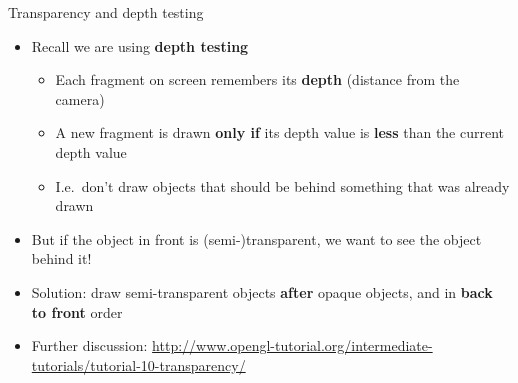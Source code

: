 \begin{frame}{Transparency and depth testing}
	\begin{itemize}
		\pause\item Recall we are using \textbf{depth testing}
			\begin{itemize}
				\pause\item Each fragment on screen remembers its \textbf{depth} (distance from the camera)
				\pause\item A new fragment is drawn \textbf{only if} its depth value is \textbf{less} than the current depth value
				\pause\item I.e.\ don't draw objects that should be behind something that was already drawn
			\end{itemize}
		\pause\item But if the object in front is (semi-)transparent, we want to see the object behind it!
		\pause\item Solution: draw semi-transparent objects \textbf{after} opaque objects,
			and in \textbf{back to front} order
		\pause\item Further discussion: {\footnotesize\url{http://www.opengl-tutorial.org/intermediate-tutorials/tutorial-10-transparency/}}
	\end{itemize}
\end{frame}
